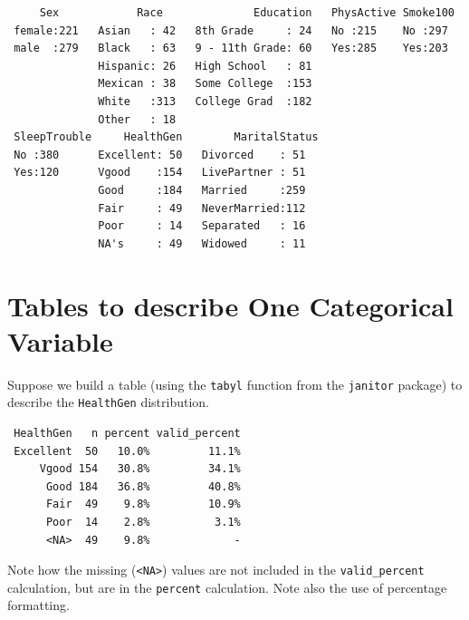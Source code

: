 \documentclass[
]{book}
\newenvironment{Shaded}{\begin{snugshade}}{\end{snugshade}}
\newcommand{\KeywordTok}[1]{\textcolor[rgb]{0.13,0.29,0.53}{\textbf{#1}}}
\newcommand{\NormalTok}[1]{#1}
\newcommand{\OperatorTok}[1]{\textcolor[rgb]{0.81,0.36,0.00}{\textbf{#1}}}
\newcommand{\StringTok}[1]{\textcolor[rgb]{0.31,0.60,0.02}{#1}}
\begin{document}
\begin{verbatim}
     Sex            Race              Education   PhysActive Smoke100 
 female:221   Asian   : 42   8th Grade     : 24   No :215    No :297  
 male  :279   Black   : 63   9 - 11th Grade: 60   Yes:285    Yes:203  
              Hispanic: 26   High School   : 81                       
              Mexican : 38   Some College  :153                       
              White   :313   College Grad  :182                       
              Other   : 18                                            
 SleepTrouble     HealthGen        MaritalStatus
 No :380      Excellent: 50   Divorced    : 51  
 Yes:120      Vgood    :154   LivePartner : 51  
              Good     :184   Married     :259  
              Fair     : 49   NeverMarried:112  
              Poor     : 14   Separated   : 16  
              NA's     : 49   Widowed     : 11  
\end{verbatim}

\hypertarget{tables-to-describe-one-categorical-variable}{%
\section{Tables to describe One Categorical Variable}\label{tables-to-describe-one-categorical-variable}}

Suppose we build a table (using the \texttt{tabyl} function from the \texttt{janitor} package) to describe the \texttt{HealthGen} distribution.

\begin{Shaded}
\end{Shaded}

\begin{verbatim}
 HealthGen   n percent valid_percent
 Excellent  50   10.0%         11.1%
     Vgood 154   30.8%         34.1%
      Good 184   36.8%         40.8%
      Fair  49    9.8%         10.9%
      Poor  14    2.8%          3.1%
      <NA>  49    9.8%             -
\end{verbatim}

Note how the missing (\texttt{\textless{}NA\textgreater{}}) values are not included in the \texttt{valid\_percent} calculation, but are in the \texttt{percent} calculation. Note also the use of percentage formatting.
\end{document}
